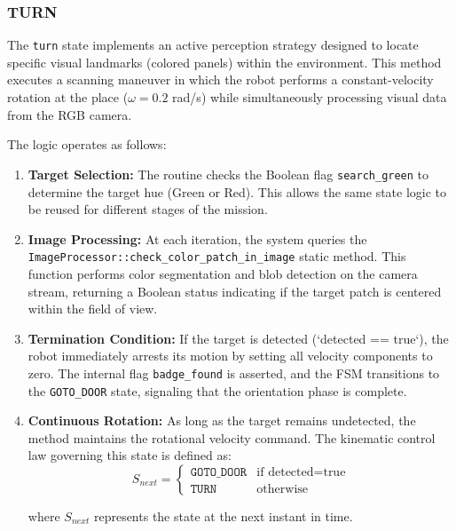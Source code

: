 \documentclass[conference]{IEEEtran}
\begin{document}
    \subsubsection{TURN}
    The \texttt{turn} state implements an active perception strategy designed to locate specific visual landmarks (colored panels) within the environment. This method executes a scanning maneuver in which the robot performs a constant-velocity rotation at the place ($\omega = 0.2$ rad/s) while simultaneously processing visual data from the RGB camera.
    
    The logic operates as follows:
    \begin{enumerate}
        \item \textbf{Target Selection:} The routine checks the Boolean flag \texttt{search\_green} to determine the target hue (Green or Red). This allows the same state logic to be reused for different stages of the mission.
        \item \textbf{Image Processing:} At each iteration, the system queries the \texttt{ImageProcessor::check\_color\_patch\_in\_image} static method. This function performs color segmentation and blob detection on the camera stream, returning a Boolean status indicating if the target patch is centered within the field of view.
        \item \textbf{Termination Condition:} If the target is detected (`detected == true`), the robot immediately arrests its motion by setting all velocity components to zero. The internal flag \texttt{badge\_found} is asserted, and the FSM transitions to the \texttt{GOTO\_DOOR} state, signaling that the orientation phase is complete.
        \item \textbf{Continuous Rotation:} As long as the target remains undetected, the method maintains the rotational velocity command. The kinematic control law governing this state is defined as:
        \begin{equation}
            S_{next} = 
            \begin{cases} 
                \texttt{GOTO\_DOOR} & \text{if } \text{detected} = \text{true} \\
                \texttt{TURN} & \text{otherwise}
            \end{cases}
            \label{eq:turn_logic}
        \end{equation}

    \noindent where $S_{next}$ represents the state at the next instant in time.        
    \end{enumerate}
    
\end{document}
